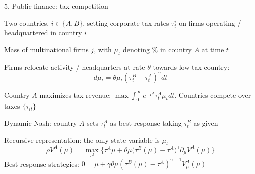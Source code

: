 \documentclass[11pt, aspectratio=169]{beamer}
\newenvironment{witemize}{\itemize\addtolength{\itemsep}{10pt}}{\enditemize}
\begin{document}
\begin{frame}{5. Public finance: tax competition}

{\small
\begin{witemize}
\item Two countries, $i \in \{A, B\}$, setting corporate tax rates $\tau_t^i$ on firms operating / headquartered in country $i$

\item Mass of multinational firms $j$, with $\mu_t$ denoting $\%$ in country $A$ at time $t$

\item Firms relocate activity / headquarters at rate $\theta$ towards low-tax country:
\begin{equation*}
	d \mu_t = \theta \mu_t (\tau_t^B - \tau_t^A)^\gamma dt  
\end{equation*}

\item Country $A$ maximizes tax revenue: $\max \int_0^\infty e^{- \rho t} \tau_t^A \mu_t dt$. Countries compete over taxes $\{ \tau_{it} \}$

\item Dynamic Nash: country $A$ sets $\tau_t^A$ as best response taking $\tau_t^B$ as given 

\item Recursive representation: the only state variable is $\mu_t$
\begin{equation*}
	\rho V^A(\mu) = \max_{\tau^A} \Big\{ \tau^A \mu + \theta \mu \Big( \tau^B(\mu) - \tau^A \Big)^\gamma \partial_\mu V^A(\mu) \Big\}
\end{equation*}
Best response strategies: $0 = \mu + \gamma \theta \mu (\tau^B(\mu) - \tau^A)^{\gamma - 1} V_\mu^A(\mu)$
\end{witemize}
}
\end{frame}
\end{document}
